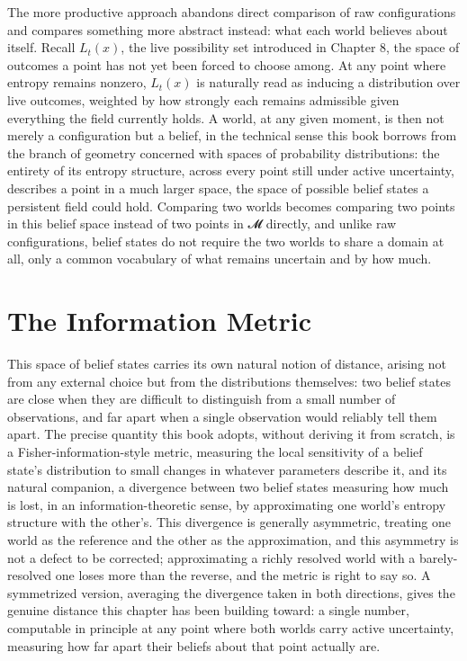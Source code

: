 The more productive approach abandons direct comparison of raw configurations and compares something more abstract instead: what each world believes about itself. Recall \(L_t(x)\), the live possibility set introduced in Chapter 8, the space of outcomes a point has not yet been forced to choose among. At any point where entropy remains nonzero, \(L_t(x)\) is naturally read as inducing a distribution over live outcomes, weighted by how strongly each remains admissible given everything the field currently holds. A world, at any given moment, is then not merely a configuration but a belief, in the technical sense this book borrows from the branch of geometry concerned with spaces of probability distributions: the entirety of its entropy structure, across every point still under active uncertainty, describes a point in a much larger space, the space of possible belief states a persistent field could hold. Comparing two worlds becomes comparing two points in this belief space instead of two points in 𝓜 directly, and unlike raw configurations, belief states do not require the two worlds to share a domain at all, only a common vocabulary of what remains uncertain and by how much.

\section{The Information Metric}

This space of belief states carries its own natural notion of distance, arising not from any external choice but from the distributions themselves: two belief states are close when they are difficult to distinguish from a small number of observations, and far apart when a single observation would reliably tell them apart. The precise quantity this book adopts, without deriving it from scratch, is a Fisher-information-style metric, measuring the local sensitivity of a belief state's distribution to small changes in whatever parameters describe it, and its natural companion, a divergence between two belief states measuring how much is lost, in an information-theoretic sense, by approximating one world's entropy structure with the other's. This divergence is generally asymmetric, treating one world as the reference and the other as the approximation, and this asymmetry is not a defect to be corrected; approximating a richly resolved world with a barely-resolved one loses more than the reverse, and the metric is right to say so. A symmetrized version, averaging the divergence taken in both directions, gives the genuine distance this chapter has been building toward: a single number, computable in principle at any point where both worlds carry active uncertainty, measuring how far apart their beliefs about that point actually are.

